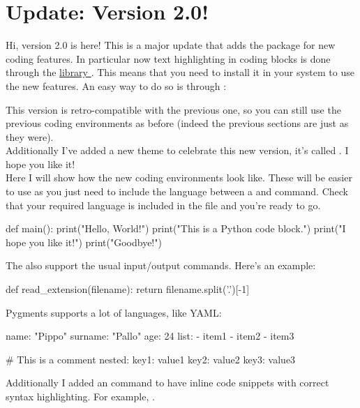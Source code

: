\documentclass[../main.tex]{subfiles}
\begin{document}
\section{Update: Version 2.0! }

Hi, version 2.0 is here! This is a major update that adds the 
package for new coding features. In particular now text highlighting in coding
blocks is done through the 
\href{https://pygments.org/}{ library }
. This means that you need to
install it in your system to use the new features. An easy way to do so is
through :

\begin{cbox}
\end{cbox}

This version is retro-compatible with the previous one, so you can still use the
previous coding environments as before (indeed the previous sections are just as
they were).\\
Additionally I've added a new theme to celebrate this new version, it's called
. I hope you
like it!\\
Here I will show how the new coding environments look like. These will be easier
to use as you just need to include the language between a  and
 command. Check that your required language is included in the
 file and you're ready to go.

\begin{python}
def main():
		print("Hello, World!")
		print("This is a Python code block.")
		print("I hope you like it!")
		print("Goodbye!")
\end{python}

The also support the usual input/output commands. Here's an example:

\begin{python}[title=Python code block,
	input={input.txt},
	output=The file extension
]
def read_extension(filename):
		return filename.split('.')[-1]
\end{python}

Pygments supports a lot of languages, like YAML:

\begin{yaml}
name: "Pippo"
surname: "Pallo"
age: 24
list:
	- item1
	- item2
	- item3

# This is a comment
nested:
	key1: value1
	key2: value2
	key3: value3
\end{yaml}

Additionally I added an  command to have inline code snippets with
correct syntax highlighting. For example, .
\end{document}
